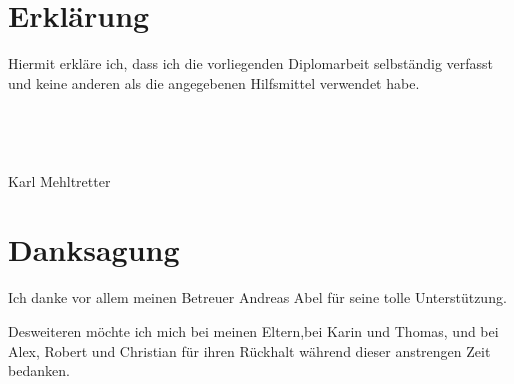 \chapter*{Erkl\"arung}
Hiermit erkl\"are ich, dass ich die vorliegenden Diplomarbeit selbst\"andig verfasst und keine anderen als die angegebenen Hilfsmittel verwendet habe.
\\
\\
\\
\\
\\
{\Large Karl Mehltretter}\\

\chapter*{Danksagung}

Ich danke vor allem meinen Betreuer Andreas Abel f\"ur seine tolle Unterst\"utzung.

Desweiteren m\"ochte ich mich bei meinen Eltern,bei Karin und Thomas, und bei Alex, Robert und Christian f\"ur ihren R\"uckhalt w\"ahrend dieser anstrengen Zeit bedanken.
